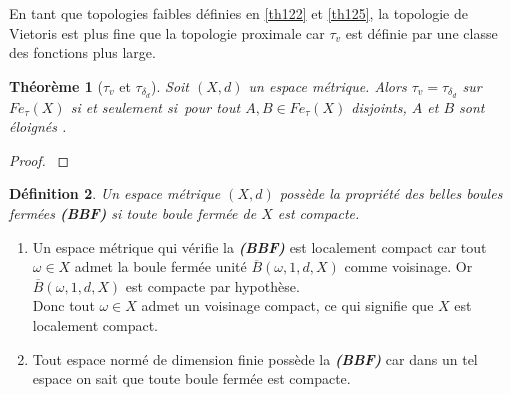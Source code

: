 \documentclass[11pt]{report}
\newenvironment{boxtheorem}
{\begin{tcolorbox}
		[enhanced jigsaw,breakable,pad at break*=2mm,
		colback=black!5,colframe=bleueLeger]}
	{\end{tcolorbox}}
\newenvironment{boxdefinition}
{\begin{tcolorbox}
		[enhanced jigsaw,breakable,pad at break*=1mm,
		colback=black!5!white,boxrule=0pt,frame hidden,
		borderline west={1.5mm}{-2mm}{blue}]}
	{\end{tcolorbox}}
\theoremstyle{styletheorem}
\newtheorem{theoreme}{Théorème}[section]
\newenvironment{theorem}
{\vspace*{0.3cm}\begin{boxtheorem}\begin{theoreme}}{\end{theoreme}\end{boxtheorem}\vspace*{0.3cm}}
\theoremstyle{styledef}
\newtheorem{definitions}[theoreme]{Définition}
\theoremstyle{remark}
\newenvironment{definition}{\vspace*{0.3cm}\begin{boxdefinition}\begin{definitions}}{\end{definitions}\end{boxdefinition}\vspace*{0.3cm}}
\newcommand{\ssi}{si et seulement si\  }
\newcommand{\Fe}{\ensuremath{Fe_{\tau}(X)}}
\begin{document}
	En tant que topologies faibles définies en \ref{th122} et \ref{th125}, la topologie de Vietoris est plus fine que la topologie proximale car $\tau_v$ est définie par une classe des fonctions plus large.
	\begin{theorem}[$\tau_v$ et $\tau_{\delta_d}$]
		Soit $(X,d)$ un espace métrique. Alors $\tau_v = \tau_{\delta_d}$ sur $\Fe$ \ssi pour tout $A, B \in \Fe$ disjoints, $A$ et $B$ sont éloignés \cite{b8}.  
	\end{theorem}
	\begin{proof}\cite{b8}
	\end{proof}
	\begin{definition}\label{belleboule}
		Un espace métrique $(X,d)$ possède la propriété des belles boules fermées \textbf{\textit{(BBF)}} si toute boule fermée de $X$ est compacte. 
	\end{definition}
	\begin{enumerate}[label = $\bullet$]
		\item Un espace métrique qui vérifie la \textbf{\textit{(BBF)}} est localement compact car tout $\omega \in X$ admet la boule fermée unité  $\overline{B}(\omega,1,d,X) $ comme voisinage. Or $\overline{B}(\omega,1,d,X)$ est compacte par hypothèse.\\
		Donc tout $\omega \in X$ admet un voisinage compact, ce qui signifie que $X$ est localement compact.
		
		\item Tout espace normé de dimension finie possède la \textbf{\textit{(BBF)}} car dans un tel espace on sait \cite{b9} que toute boule fermée est compacte.
	\end{enumerate}
	
\end{document}
